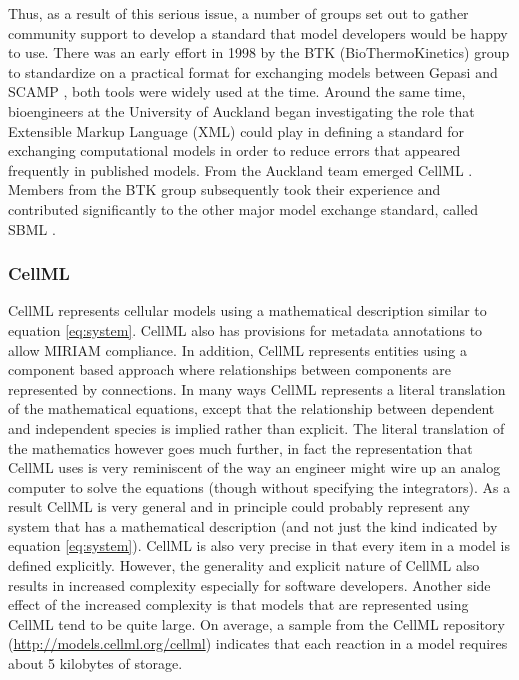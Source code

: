 Thus, as a result of this serious issue, a number of groups set out to
gather community support to develop a standard that model developers
would be happy to use. There was an early effort in 1998 by the BTK
(BioThermoKinetics) group to standardize on a practical format for
exchanging models between Gepasi \autocite{Gepasi:1993} and SCAMP
\autocite{SauroF91}, both tools were widely used at the time. Around the
same time, bioengineers at the University of Auckland began
investigating the role that Extensible Markup Language (XML)
\autocite{harold:2001} could play in defining a standard for exchanging
computational models in order to reduce errors that appeared frequently
in published models. From the Auckland team emerged CellML
\autocite{LloydCellML2004}. Members from the BTK group subsequently took
their experience and contributed significantly to the other major model
exchange standard, called SBML \autocite{hucka:2002d}.

\subsubsection{CellML}

CellML \autocite{LloydCellML2004} represents cellular models using a
mathematical description similar to equation \ref{eq:system}. CellML
also has provisions for metadata annotations to allow MIRIAM compliance.
In addition, CellML represents entities using a component based approach
where relationships between components are represented by connections.
In many ways CellML represents a literal translation of the mathematical
equations, except that the relationship between dependent and
independent species is implied rather than explicit. The literal
translation of the mathematics however goes much further, in fact the
representation that CellML uses is very reminiscent of the way an
engineer might wire up an analog computer to solve the equations (though
without specifying the integrators). As a result CellML is very general
and in principle could probably represent any system that has a
mathematical description (and not just the kind indicated by equation
\ref{eq:system}). CellML is also very precise in that every item in a
model is defined explicitly. However, the generality and explicit nature
of CellML also results in increased complexity especially for software
developers. Another side effect of the increased complexity is that
models that are represented using CellML tend to be quite large. On
average, a sample from the CellML repository
(\url{http://models.cellml.org/cellml}) indicates that each reaction in
a model requires about 5 kilobytes of storage.

